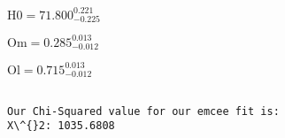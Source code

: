 \documentclass[11pt]{article}
\makeatletter
\newcommand{\boxspacing}{\kern\kvtcb@left@rule\kern\kvtcb@boxsep}
\newcommand{\prompt}[4]{
        {\ttfamily\llap{{\color{#2}[#3]:\hspace{3pt}#4}}\vspace{-\baselineskip}}
    }
\makeatother
\begin{document}
    $\displaystyle \mathrm{H0} = 71.800_{-0.225}^{0.221}$

    
    $\displaystyle \mathrm{Om} = 0.285_{-0.012}^{0.013}$

    
    $\displaystyle \mathrm{Ol} = 0.715_{-0.012}^{0.013}$

    
    \begin{Verbatim}[commandchars=\\\{\}]

Our Chi-Squared value for our emcee fit is:
X\^{}2: 1035.6808
    \end{Verbatim}

    \begin{tcolorbox}[breakable, size=fbox, boxrule=1pt, pad at break*=1mm,colback=cellbackground, colframe=cellborder]
\prompt{In}{incolor}{ }{\boxspacing}
\begin{Verbatim}[commandchars=\\\{\}]

\end{Verbatim}
\end{tcolorbox}


    
    
    
\end{document}
